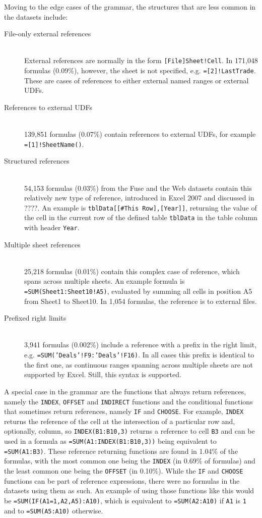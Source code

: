 \documentclass[times]{smrauth}
\begin{document}
Moving to the edge cases of the grammar, the structures that are less common in the datasets include:
\begin{description}
	\item[File-only external references] \hfill \\
	External references are normally in the form \texttt{[File]Sheet!Cell}. In 171,048 formulas (0.09\%), however, the sheet is not specified, e.g. \texttt{=[2]!LastTrade}. These are cases of references to either external named ranges or external UDFs.
	\item[References to external UDFs] \hfill \\
	139,851 formulas (0.07\%) contain references to external UDFs, for example \texttt{=[1]!SheetName()}.
	\item[Structured references] \hfill \\
	54,153 formulas (0.03\%) from the Fuse and the Web datasets contain this relatively new type of reference, introduced in Excel 2007 and discussed in ????. An example is \texttt{tblData[[\#This Row],[Year]]}, returning the value of the cell in the current row of the defined table \texttt{tblData} in the table column with header \texttt{Year}.
	\item[Multiple sheet references] \hfill \\
	25,218 formulas (0.01\%) contain this complex case of reference, which spans across multiple sheets. An example formula is \texttt{=SUM(Sheet1:Sheet10!A5)}, evaluated by summing all cells in position A5 from Sheet1 to Sheet10. In 1,054 formulas, the reference is to external files.
	\item[Prefixed right limits] \hfill \\
	3,941 formulas (0.002\%) include a reference with a prefix in the right limit, e.g. \texttt{=SUM('Deals'!F9:'Deals'!F16)}. In all cases this prefix is identical to the first one, as continuous ranges spanning across multiple sheets are not supported by Excel. Still, this syntax is supported.
\end{description}

A special case in the grammar are the functions that always return references, namely the \texttt{INDEX}, \texttt{OFFSET} and \texttt{INDIRECT} functions and the conditional functions that sometimes return references, namely \texttt{IF} and \texttt{CHOOSE}.
For example, \texttt{INDEX} returns the reference of the cell at the intersection of a particular row and, optionally, column, so \texttt{INDEX(B1:B10,3)} returns a reference to cell \texttt{B3} and can be used in a formula as \texttt{=SUM(A1:INDEX(B1:B10,3))} being equivalent to \texttt{=SUM(A1:B3)}.
These reference returning functions are found in 1.04\% of the formulas, with the most common one being the \texttt{INDEX} (in 0.69\% of formulas) and the least common one being the \texttt{OFFSET} (in 0.10\%).
While the \texttt{IF} and \texttt{CHOOSE} functions can be part of reference expressions, there were no formulas in the datasets using them as such.
An example of using those functions like this would be \texttt{=SUM(IF(A1=1,A2,A5):A10)}, which is equivalent to \texttt{=SUM(A2:A10)} if \texttt{A1} is \texttt{1} and to \texttt{=SUM(A5:A10)} otherwise.
\end{document}
